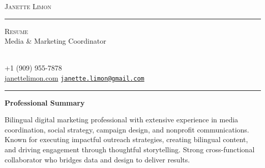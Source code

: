 \documentclass[10pt,a4paper,]{article}
\renewcommand{\section}[1]
{
	\begin{center}
		\large\textcolor{sectcol}{\textbf{#1}}
	\end{center}
}
\newcommand{\metasection}[2]
{
\footnotesize{#2} \hspace*{\fill} \footnotesize{#1}\\[1pt]
}
\begin{document}
\pagestyle{fancy}






\vspace{-8pt}
\begin{center}
	\HUGE \textsc{Janette Limon} \textcolor{sectcol}{\rule[-1mm]{1mm}{0.9cm}} \textsc{Resume}\\[2pt]
	\small Media \& Marketing Coordinator
\end{center}


\vspace{6pt}


\metasection{}{}
\metasection{ +1 (909) 955-7878}{}
\metasection{ \href{mailto:janette.limon@gmail.com}{\nolinkurl{janette.limon@gmail.com}}}{\faicon{home} \href{http://janettelimon.com}{janettelimon.com}}
\vspace{-2pt}
\textcolor{softcol}{\hrule}
\vspace{6pt}

\normalsize



%
%



\section{Professional Summary}\label{professional-summary}

Bilingual digital marketing professional with extensive experience in
media coordination, social strategy, campaign design, and nonprofit
communications. Known for executing impactful outreach strategies,
creating bilingual content, and driving engagement through thoughtful
storytelling. Strong cross-functional collaborator who bridges data and
design to deliver results.
\end{document}
